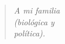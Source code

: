 \begin{verse}
\begin{flushright}
\vspace*{3cm}
\textit{A mi familia\\ 
	(biológica y\\
	 política).}
\end{flushright}
\end{verse}
